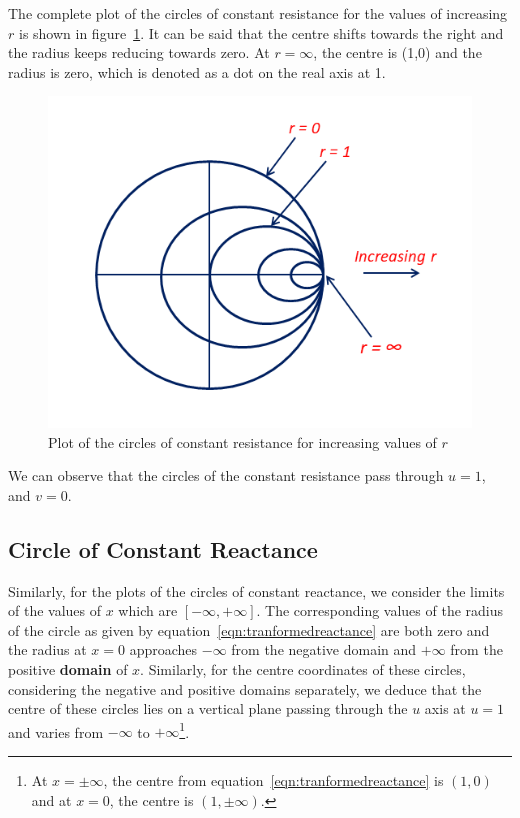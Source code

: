 The complete plot of the circles of constant resistance for the values of increasing $r$ is shown in figure~\ref{fig:rghmgfcx}. It can be said that the centre shifts towards the right and the radius keeps reducing towards zero. At $r = \infty$, the centre is (1,0) and the radius is zero, which is denoted as a dot on the real axis at 1.
\begin{figure}[h]
\centering
\includegraphics[width=0.9\linewidth]{graphics/const_resistance_circles}
\caption{Plot of the circles of constant resistance for increasing values of $r$}
\label{fig:rghmgfcx}
\end{figure}

We can observe that the circles of the constant resistance pass through $u = 1$, and $v = 0$.

\subsection{Circle of Constant Reactance}
Similarly, for the plots of the circles of constant reactance, we consider the limits of the values of $x$ which are $[-\infty, +\infty]$. The corresponding values of the radius of the circle as given by equation~\eqref{eqn:tranformedreactance} are both zero and the radius at $x = 0$ approaches $-\infty$ from the negative domain and $+\infty$ from the positive \textbf{domain} of $x$. Similarly, for the centre coordinates of these circles, considering the negative and positive domains separately, we deduce that the centre of these circles lies on a vertical plane passing through the $u$ axis at $u = 1$ and varies from $-\infty$ to $+\infty$\footnote{
At $x = \pm\infty$, the centre from equation~\eqref{eqn:tranformedreactance} is $(1, 0)$ and at $x = 0$, the centre is $(1, \pm\infty)$.
}.


